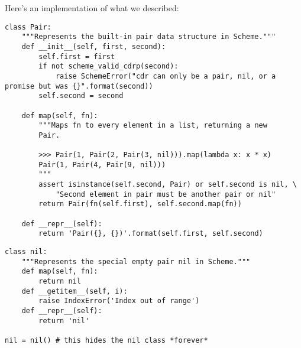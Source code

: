 Here's an implementation of what we described:

\begin{blocksection}
\begin{lstlisting}
class Pair:
    """Represents the built-in pair data structure in Scheme."""
    def __init__(self, first, second):
        self.first = first
        if not scheme_valid_cdrp(second):
            raise SchemeError("cdr can only be a pair, nil, or a promise but was {}".format(second))
        self.second = second

    def map(self, fn):
        """Maps fn to every element in a list, returning a new
        Pair.

        >>> Pair(1, Pair(2, Pair(3, nil))).map(lambda x: x * x)
        Pair(1, Pair(4, Pair(9, nil)))
        """
        assert isinstance(self.second, Pair) or self.second is nil, \
            "Second element in pair must be another pair or nil"
        return Pair(fn(self.first), self.second.map(fn))

    def __repr__(self):
        return 'Pair({}, {})'.format(self.first, self.second)
\end{lstlisting}




\begin{lstlisting}
class nil:
    """Represents the special empty pair nil in Scheme."""
    def map(self, fn):
        return nil
    def __getitem__(self, i):
        raise IndexError('Index out of range')
    def __repr__(self):
        return 'nil'

nil = nil() # this hides the nil class *forever*
\end{lstlisting}
\end{blocksection}

